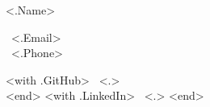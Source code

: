 \begin{minipage}[t][0.8cm][c]{.45\textwidth}
{\centering \fontsize{36pt}{42pt}\selectfont <.Name>}
\end{minipage}
\begin{minipage}[t][0.8cm][c]{0.32\textwidth}
{\fontsize{14}{18}\selectfont
\faEnvelope \ <.Email>
\vspace{6 pt}\\
\faPhone \ <.Phone>}
\end{minipage}
\begin{minipage}[t][0.8cm][c]{0.30\textwidth}
{
    \fontsize{14}{18}\selectfont
    <with .GitHub> \faGithub \ <.> \vspace{6 pt}\\ <end>
    <with .LinkedIn> \faLinkedin \ <.> <end>
}
\end{minipage}
\vspace{6 pt}\\
\noindent\makebox[\linewidth]{\rule{\paperwidth}{0.4pt}}
\vspace{6 pt}\\